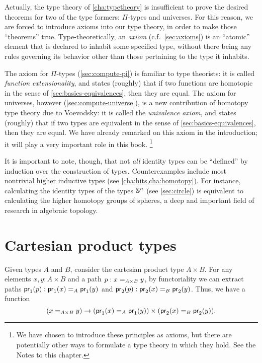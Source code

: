 Actually, the type theory of \autoref{cha:typetheory} is insufficient to prove the desired theorems for two of the type formers: $\Pi$-types and universes.
For this reason, we are forced to introduce axioms into our type theory, in order to make those ``theorems'' true.
Type-theoretically, an \emph{axiom} (c.f.~\autoref{sec:axioms}) is an ``atomic'' element that is declared to inhabit some specified type, without there being any rules governing its behavior other than those pertaining to the type it inhabits.
%

%
%
The axiom for $\Pi$-types (\autoref{sec:compute-pi}) is familiar to type theorists: it is called \emph{function extensionality}, and states (roughly) that if two functions are homotopic in the sense of \autoref{sec:basics-equivalences}, then they are equal.
The axiom for universes, however (\autoref{sec:compute-universe}), is a new contribution of homotopy type theory due to Voevodsky: it is called the \emph{univalence axiom}, and states (roughly) that if two types are equivalent in the sense of \autoref{sec:basics-equivalences}, then they are equal.
We have already remarked on this axiom in the introduction; it will play a very important role in this book.%
\footnote{We have chosen to introduce these principles as axioms, but there are potentially other ways to formulate a type theory in which they hold.
  See the Notes to this chapter.}

It is important to note, though, that not \emph{all} identity types can be ``defined'' by induction over the construction of types.
Counterexamples include most nontrivial higher inductive types (see \autoref{cha:hits,cha:homotopy}).
For instance, calculating the identity types of the types $\Sn^n$ (see \autoref{sec:circle}) is equivalent to calculating the higher homotopy groups of spheres, a deep and important field of research in algebraic topology.


\section{Cartesian product types}
\label{sec:compute-cartprod}

%
Given types $A$ and $B$, consider the cartesian product type $A \times B$.  
For any elements $x,y:A\times B$ and a path $p:\id[A\times B]{x}{y}$, by functoriality we can extract paths $\ap{\proj1}p:\id[A]{\proj1(x)}{\proj1(y)}$ and $\ap{\proj2}p:\id[B]{\proj2(x)}{\proj2(y)}$.
Thus, we have a function
\begin{equation}\label{eq:path-prod}
  (\id[A\times B]{x}{y}) \to (\id[A]{\proj1(x)}{\proj1(y)}) \times (\id[B]{\proj2(x)}{\proj2(y)}).
\end{equation}

